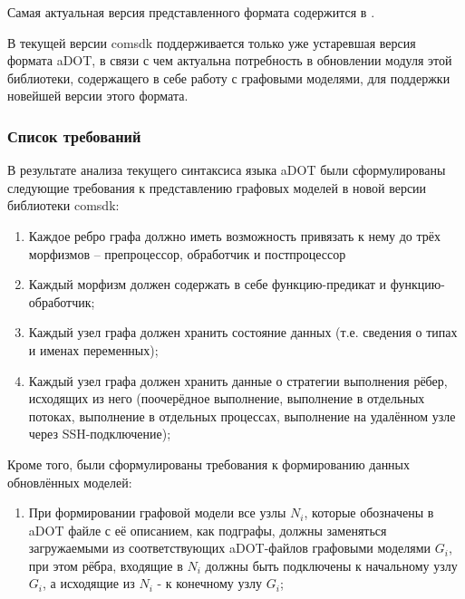 Самая актуальная версия представленного формата содержится в \cite{SokolovADOT2020}.

В текущей версии comsdk поддерживается только уже устаревшая версия формата aDOT, в связи с чем актуальна потребность в обновлении модуля этой библиотеки, содержащего в себе работу с графовыми моделями, для поддержки новейшей версии этого формата.

\subsubsection{Список требований}
В результате анализа текущего синтаксиса языка aDOT были сформулированы следующие требования к представлению графовых моделей в новой версии библиотеки comsdk:
\begin{enumerate}[label=\arabic*)]
    \item Каждое ребро графа должно иметь возможность привязать к нему до трёх морфизмов -- препроцессор, обработчик и постпроцессор
    \item Каждый морфизм должен содержать в себе функцию-предикат и функцию-обработчик;
    \item Каждый узел графа должен хранить состояние данных (т.е. сведения о типах и именах переменных);
    \item Каждый узел графа должен хранить данные о стратегии выполнения рёбер, исходящих из него (поочерёдное выполнение, выполнение в отдельных потоках, выполнение в отдельных процессах, выполнение на удалённом узле через SSH-подключение);
\end{enumerate}

Кроме того, были сформулированы требования к формированию данных обновлённых моделей:
\begin{enumerate}
    \item При формировании графовой модели все узлы $N_i$, которые обозначены в \gls{aDOT} файле с её описанием, как подграфы, должны заменяться загружаемыми из соответствующих aDOT-файлов графовыми моделями $G_i$, при этом рёбра, входящие в $N_i$ должны быть подключены к начальному узлу $G_i$, а исходящие из $N_i$ - к конечному узлу $G_i$;
\end{enumerate}

\noteattributes{}
